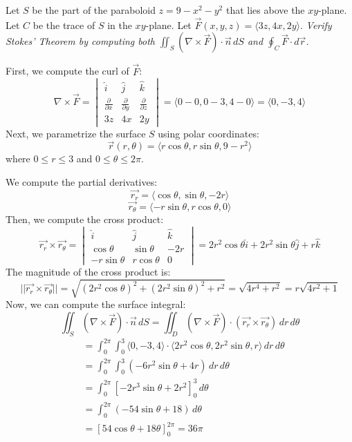 \documentclass[11pt]{report}
\begin{document}
\begin{example}
    Let $S$ be the part of the paraboloid $z = 9 - x^2 - y^2$ that lies above the $xy$-plane. Let $C$ be the trace of $S$ in the $xy$-plane. Let $\vec{F}(x,y,z) = \langle 3z, 4x, 2y \rangle$. \textit{Verify Stokes' Theorem by computing both $\iint_S (\nabla \times \vec{F}) \cdot \vec{n} \, dS$ and $\oint_C \vec{F} \cdot d\vec{r}$.}

First, we compute the curl of \(\vec{F}\):
\[\nabla \times \vec{F} = \begin{vmatrix}
\hat{i} & \hat{j} & \hat{k} \\
\frac{\partial}{\partial x} & \frac{\partial}{\partial y} & \frac{\partial}{\partial z} \\
3z & 4x & 2y
\end{vmatrix} = \langle 0 - 0, 0 - 3, 4 - 0 \rangle = \langle 0, -3, 4 \rangle\]    
Next, we parametrize the surface \(S\) using polar coordinates:
\[\vec{r}(r, \theta) = \langle r \cos \theta, r \sin \theta, 9 - r^2 \rangle\]
where \(0 \leq r \leq 3\) and \(0 \leq \theta \leq 2\pi\).

We compute the partial derivatives:
\[\vec{r_r} = \langle \cos \theta, \sin \theta, -2r \rangle\]
\[\vec{r_\theta} = \langle -r \sin \theta, r \cos \theta, 0 \rangle\]
Then, we compute the cross product:
\[\vec{r_r} \times \vec{r_\theta} = \begin{vmatrix}
\hat{i} & \hat{j} & \hat{k} \\
\cos \theta & \sin \theta & -2r \\
-r \sin \theta & r \cos \theta & 0 
\end{vmatrix} = 2r^2 \cos \theta \hat{i} + 2r^2 \sin \theta \hat{j} + r \hat{k}\]
The magnitude of the cross product is:
\[||\vec{r_r} \times \vec{r_\theta}|| = \sqrt{(2r^2 \cos \theta)^2 + (2r^2 \sin \theta)^2 + r^2} = \sqrt{4r^4 + r^2} = r \sqrt{4r^2 + 1}\]
Now, we can compute the surface integral:
\[\iint_S (\nabla \times \vec{F}) \cdot \vec{n} \, dS = \iint_D (\nabla \times \vec{F}) \cdot (\vec{r_r} \times \vec{r_\theta}) \, dr \, d\theta\]
\begin{align*}
&= \int_0^{2\pi} \int_0^3 \langle 0, -3, 4 \rangle \cdot \langle 2r^2 \cos \theta, 2r^2 \sin \theta, r \rangle \, dr \, d\theta \\
&= \int_0^{2\pi} \int_0^3 (-6r^2 \sin \theta + 4r) \, dr \, d\theta \\
&= \int_0^{2\pi} \left[ -2r^3 \sin \theta + 2r^2 \right]_0^3 \, d\theta \\
&= \int_0^{2\pi} (-54 \sin \theta + 18) \, d\theta \\
&= \left[ 54 \cos \theta + 18 \theta \right]_0^{2\pi} = 36\pi   
\end{align*}


\end{example}
\end{document}
